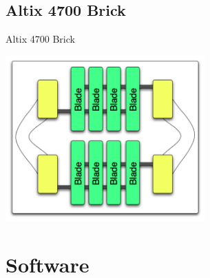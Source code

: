 \documentclass[handout]{beamer}
\begin{document}
  \subsection{Altix 4700 Brick}
  \begin{frame}{Altix 4700 Brick}
   \begin{center}\includegraphics[height=2.5in]{bighouseBrick}\end{center}
  \end{frame}

\section{Software}
\end{document}
